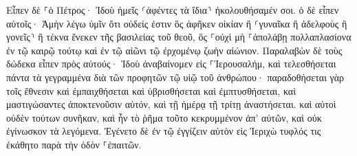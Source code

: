 \documentclass{openreader}
\begin{document}
Εἶπεν δὲ ⸀ὁ Πέτρος· Ἰδοὺ ἡμεῖς ⸂ἀφέντες τὰ ἴδια⸃ ἠκολουθήσαμέν σοι. 
ὁ δὲ εἶπεν αὐτοῖς· Ἀμὴν λέγω ὑμῖν ὅτι οὐδείς ἐστιν ὃς ἀφῆκεν οἰκίαν ἢ ⸂γυναῖκα ἢ ἀδελφοὺς ἢ γονεῖς⸃ ἢ τέκνα ἕνεκεν τῆς βασιλείας τοῦ θεοῦ, 
ὃς ⸀οὐχὶ μὴ ⸀ἀπολάβῃ πολλαπλασίονα ἐν τῷ καιρῷ τούτῳ καὶ ἐν τῷ αἰῶνι τῷ ἐρχομένῳ ζωὴν αἰώνιον. 
Παραλαβὼν δὲ τοὺς δώδεκα εἶπεν πρὸς αὐτούς· Ἰδοὺ ἀναβαίνομεν εἰς ⸀Ἰερουσαλήμ, καὶ τελεσθήσεται πάντα τὰ γεγραμμένα διὰ τῶν προφητῶν τῷ υἱῷ τοῦ ἀνθρώπου· 
παραδοθήσεται γὰρ τοῖς ἔθνεσιν καὶ ἐμπαιχθήσεται καὶ ὑβρισθήσεται καὶ ἐμπτυσθήσεται, 
καὶ μαστιγώσαντες ἀποκτενοῦσιν αὐτόν, καὶ τῇ ἡμέρᾳ τῇ τρίτῃ ἀναστήσεται. 
καὶ αὐτοὶ οὐδὲν τούτων συνῆκαν, καὶ ἦν τὸ ῥῆμα τοῦτο κεκρυμμένον ἀπ’ αὐτῶν, καὶ οὐκ ἐγίνωσκον τὰ λεγόμενα. 
Ἐγένετο δὲ ἐν τῷ ἐγγίζειν αὐτὸν εἰς Ἰεριχὼ τυφλός τις ἐκάθητο παρὰ τὴν ὁδὸν ⸀ἐπαιτῶν. 
\end{document}
